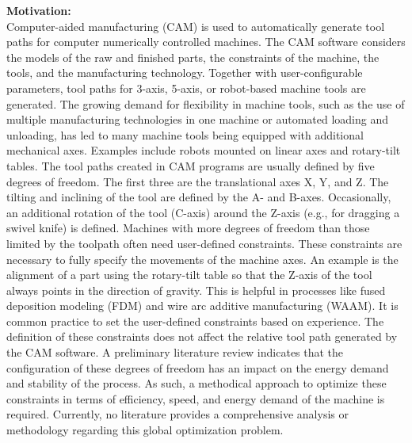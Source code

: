 \vspace{5mm}
\textbf{Motivation:}\\
Computer-aided manufacturing (\acrshort{CAM}) is used to automatically generate tool paths for 
computer numerically controlled machines. The \acrshort{CAM} software considers the models of the 
raw and finished parts, the constraints of the machine, the tools, and the manufacturing 
technology. Together with user-configurable parameters, tool paths for 3-axis, 5-axis, or 
robot-based machine tools are generated. The growing demand for flexibility in machine tools, 
such as the use of multiple manufacturing technologies in one machine or automated loading 
and unloading, has led to many machine tools being equipped with additional mechanical 
axes. Examples include robots mounted on linear axes and rotary-tilt tables.
The tool paths created in \acrshort{CAM} programs are usually defined by five degrees of freedom. The 
first three are the translational axes X, Y, and Z. The tilting and inclining of the tool are defined 
by the A- and B-axes. Occasionally, an additional rotation of the tool (C-axis) around the Z-axis (e.g., for dragging a swivel knife) is defined. Machines with more degrees of freedom than 
those limited by the toolpath often need user-defined constraints. These constraints are 
necessary to fully specify the movements of the machine axes. An example is the alignment 
of a part using the rotary-tilt table so that the Z-axis of the tool always points in the direction of 
gravity. This is helpful in processes like fused deposition modeling (\acrshort{FDM}) and wire arc additive 
manufacturing (\acrshort{WAAM}).
It is common practice to set the user-defined constraints based on experience. The definition 
of these constraints does not affect the relative tool path generated by the \acrshort{CAM} software. A 
preliminary literature review indicates that the configuration of these degrees of freedom has 
an impact on the energy demand and stability of the process. As such, a methodical approach to optimize these constraints in terms of 
efficiency, speed, and energy demand of the machine is required. Currently, no literature
provides a comprehensive analysis or methodology regarding this global optimization 
problem.

